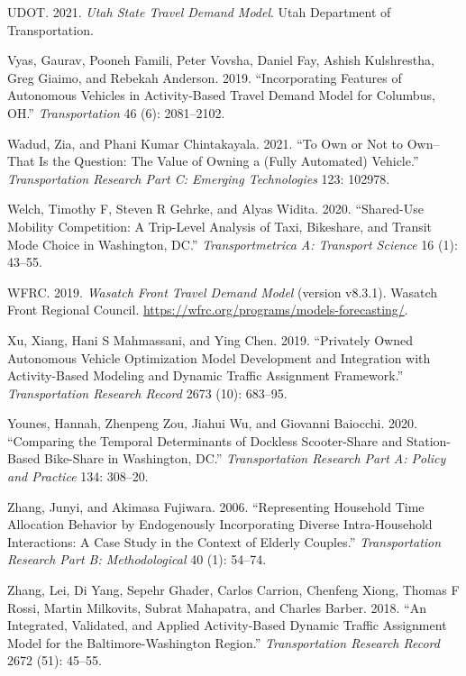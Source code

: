 \documentclass[12pt, oneside, openright]{byuthesis}
\newlength{\cslhangindent}
\newlength{\cslentryspacingunit} %
\newenvironment{CSLReferences}[2] %
 {%
  \setlength{\parindent}{0pt}
  \ifodd #1
  \let\oldpar\par
  \def\par{\hangindent=\cslhangindent\oldpar}
  \fi
  \setlength{\parskip}{#2\cslentryspacingunit}
 }%
 {}
\begin{document}
\begin{CSLReferences}{1}{0}
\leavevmode{}%
UDOT. 2021. \emph{Utah State Travel Demand Model}. Utah Department of Transportation.

\leavevmode{}%
Vyas, Gaurav, Pooneh Famili, Peter Vovsha, Daniel Fay, Ashish Kulshrestha, Greg Giaimo, and Rebekah Anderson. 2019. {``Incorporating Features of Autonomous Vehicles in Activity-Based Travel Demand Model for Columbus, OH.''} \emph{Transportation} 46 (6): 2081--2102.

\leavevmode{}%
Wadud, Zia, and Phani Kumar Chintakayala. 2021. {``To Own or Not to Own--That Is the Question: The Value of Owning a (Fully Automated) Vehicle.''} \emph{Transportation Research Part C: Emerging Technologies} 123: 102978.

\leavevmode{}%
Welch, Timothy F, Steven R Gehrke, and Alyas Widita. 2020. {``Shared-Use Mobility Competition: A Trip-Level Analysis of Taxi, Bikeshare, and Transit Mode Choice in Washington, DC.''} \emph{Transportmetrica A: Transport Science} 16 (1): 43--55.

\leavevmode{}%
WFRC. 2019. \emph{Wasatch Front Travel Demand Model} (version v8.3.1). Wasatch Front Regional Council. \url{https://wfrc.org/programs/models-forecasting/}.

\leavevmode{}%
Xu, Xiang, Hani S Mahmassani, and Ying Chen. 2019. {``Privately Owned Autonomous Vehicle Optimization Model Development and Integration with Activity-Based Modeling and Dynamic Traffic Assignment Framework.''} \emph{Transportation Research Record} 2673 (10): 683--95.

\leavevmode{}%
Younes, Hannah, Zhenpeng Zou, Jiahui Wu, and Giovanni Baiocchi. 2020. {``Comparing the Temporal Determinants of Dockless Scooter-Share and Station-Based Bike-Share in Washington, DC.''} \emph{Transportation Research Part A: Policy and Practice} 134: 308--20.

\leavevmode{}%
Zhang, Junyi, and Akimasa Fujiwara. 2006. {``Representing Household Time Allocation Behavior by Endogenously Incorporating Diverse Intra-Household Interactions: A Case Study in the Context of Elderly Couples.''} \emph{Transportation Research Part B: Methodological} 40 (1): 54--74.

\leavevmode{}%
Zhang, Lei, Di Yang, Sepehr Ghader, Carlos Carrion, Chenfeng Xiong, Thomas F Rossi, Martin Milkovits, Subrat Mahapatra, and Charles Barber. 2018. {``An Integrated, Validated, and Applied Activity-Based Dynamic Traffic Assignment Model for the Baltimore-Washington Region.''} \emph{Transportation Research Record} 2672 (51): 45--55.


\end{CSLReferences}
\end{document}
